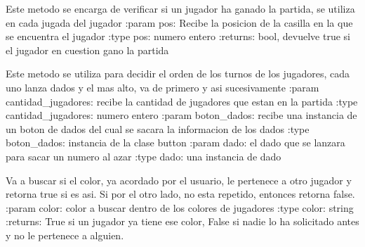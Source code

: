 \documentclass[letterpaper,10pt,english]{sphinxmanual}
\begin{document}
\begin{fulllineitems}
\begin{fulllineitems}
\end{fulllineitems}


\begin{fulllineitems}
\label{\detokenize{codigo:arbitro.Arbitro.comprobarGane}}
Este metodo se encarga de verificar si un jugador ha ganado la partida, se utiliza en cada jugada del jugador
:param pos: Recibe la posicion de la casilla en la que se encuentra el jugador 
:type pos: numero entero
:returns: bool, devuelve true si el jugador en cuestion gano la partida

\end{fulllineitems}


\begin{fulllineitems}
\label{\detokenize{codigo:arbitro.Arbitro.decidir_turnos}}
Este metodo se utiliza para decidir el orden de los turnos de los jugadores, cada uno lanza dados y el mas alto, va de primero y asi sucesivamente
:param cantidad\_jugadores: recibe la cantidad de jugadores que estan en la partida
:type cantidad\_jugadores: numero entero
:param boton\_dados: recibe una instancia de un boton de dados del cual se sacara la informacion de los dados
:type boton\_dados: instancia de la clase button
:param dado: el dado que se lanzara para sacar un numero al azar
:type dado: una instancia de dado

\end{fulllineitems}


\begin{fulllineitems}
\label{\detokenize{codigo:arbitro.Arbitro.esColorRepetido}}
Va a buscar si el color, ya acordado por el usuario, le pertenece a otro jugador y retorna true si es asi.
Si por el otro lado, no esta repetido, entonces retorna false.
:param color: color a buscar dentro de los colores de jugadores
:type color: string
:returns: True si un jugador ya tiene ese color, False si nadie lo ha solicitado antes y no le pertenece a alguien.


\end{fulllineitems}
\end{fulllineitems}
\end{document}
